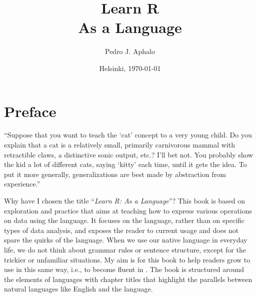 \documentclass[krantz2]{krantz}\usepackage{knitr}
\begin{document}

\title{\Huge{\sffamily Learn R\\{\Large As a Language}}}

\author{Pedro J. Aphalo}

\date{Helsinki, \today}


















\frontmatter

\maketitle

\newpage

\setcounter{page}{5} %
\tableofcontents
\listoffigures



%
%


\chapter*{Preface}

\begin{VF}
``Suppose that you want to teach the `cat' concept to a very young child. Do you explain that a cat is a relatively small, primarily carnivorous mammal with retractible claws, a distinctive sonic output, etc.? I'll bet not. You probably show the kid a lot of different cats, saying `kitty' each time, until it gets the idea. To put it more generally, generalizations are best made by abstraction from experience.''

\nocite{Boas1981}
\end{VF}

\noindent
Why have I chosen the title ``\emph{Learn R: As a Language}''? This book is based on exploration and practice that aims at teaching how to express various operations on data using the \Rlang language. It focuses on the language, rather than on specific types of data analysis, and exposes the reader to current usage and does not spare the quirks of the language. When we use our native language in everyday life, we do not think about grammar rules or sentence structure, except for the trickier or unfamiliar situations. My aim is for this book to help readers grow to use \Rlang in this same way, i.e., to become fluent in \Rlang. The book is structured around the elements of languages with chapter titles that highlight the parallels between natural languages like English and the \Rlang language.
\end{document}
